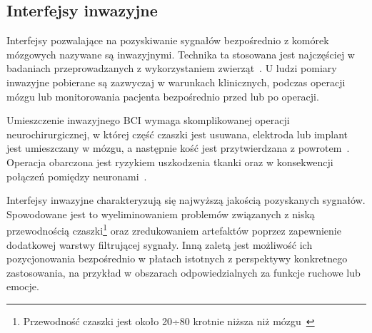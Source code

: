 \documentclass[skorowidz,skroty]{dyplomWEZUT}
\begin{document}
\subsection{Interfejsy inwazyjne\label{subsec:inwazyjne}}
Interfejsy pozwalające na pozyskiwanie sygnałów bezpośrednio z komórek mózgowych nazywane są inwazyjnymi. Technika ta stosowana jest najczęściej w badaniach przeprowadzanych z wykorzystaniem zwierząt~\cite{bci_introduction}. U ludzi pomiary inwazyjne pobierane są zazwyczaj w warunkach klinicznych, podczas operacji mózgu lub monitorowania pacjenta bezpośrednio przed lub po operacji.

Umieszczenie inwazyjnego BCI wymaga skomplikowanej operacji neurochirurgicznej, w której część czaszki jest usuwana, elektroda lub implant jest umieszczany w mózgu, a następnie kość jest przytwierdzana z powrotem~\cite{bci_introduction}. Operacja obarczona jest ryzykiem uszkodzenia tkanki oraz w konsekwencji połączeń pomiędzy neuronami~\cite{bci_revolutionizing}.

Interfejsy inwazyjne charakteryzują się najwyższą jakością pozyskanych sygnałów. Spowodowane jest to wyeliminowaniem problemów związanych z niską przewodnością czaszki\footnote{Przewodność czaszki jest około 20÷80 krotnie niższa niż mózgu~\cite{bci_technology}} oraz zredukowaniem artefaktów poprzez zapewnienie dodatkowej warstwy filtrującej sygnały. Inną zaletą jest możliwość ich pozycjonowania bezpośrednio w płatach istotnych z perspektywy konkretnego zastosowania, na przykład w obszarach odpowiedzialnych za funkcje ruchowe lub emocje.
\end{document}
